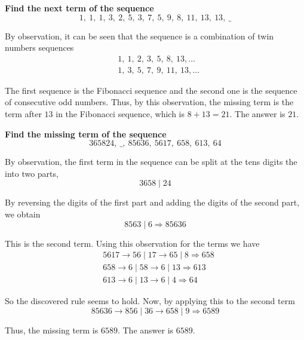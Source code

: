 \documentclass{article}
\begin{document}
\begin{problem*} \textbf{Find the next term of the sequence}
    \[
        1,\ 1,\ 1,\ 3,\ 2,\ 5,\ 3,\ 7,\ 5,\ 9,\ 8,\ 11,\ 13,\ 13,\ \_
    \]
\end{problem*}

\begin{soln}
    By observation, it can be seen that the sequence is a combination of twin numbers sequences
    \[
        \begin{aligned}
            &1,\ 1,\ 2,\ 3,\ 5,\ 8,\ 13, \ldots\\
            &1,\ 3,\ 5,\ 7,\ 9,\ 11,\ 13, \ldots
        \end{aligned}
    \]
    
    The first sequence is the Fibonacci sequence and the second one is the sequence of consecutive odd numbers.
    Thus, by this observation, the missing term is the term after $13$ in the Fibonacci sequence, which is $8+13=21$.
    The answer is $\boxed{21.}$
\end{soln}

\begin{problem*} \textbf{Find the missing term of the sequence}
    \[
        365824,\ \_ ,\ 85636,\ 5617,\ 658,\ 613,\ 64
    \]
\end{problem*}

\begin{soln}
    By observation, the first term in the sequence can be split at the tens digits the into two parts,
    \[
        3658 \mid 24
    \]

    By reversing the digits of the first part and adding the digits of the second part, we obtain
    \[
        8563 \mid 6 \Longrightarrow 85636
    \]

    This is the second term. Using this observation for the terms we have
    \[
        \begin{aligned}
            &5617 \rightarrow 56 \mid 17 \rightarrow 65 \mid 8 \Longrightarrow 658\\
            &658 \rightarrow 6 \mid 58 \rightarrow 6 \mid 13 \Longrightarrow 613\\
            &613 \rightarrow 6 \mid 13 \rightarrow 6 \mid 4 \Longrightarrow 64
        \end{aligned}
    \]

    So the discovered rule seems to hold. Now, by applying this to the second term
    \[
        85636 \rightarrow 856 \mid 36 \rightarrow 658 \mid 9 \Longrightarrow 6589
    \]
    
    Thus, the missing term is $6589.$ The answer is $\boxed{6589.}$
\end{soln}
\end{document}
